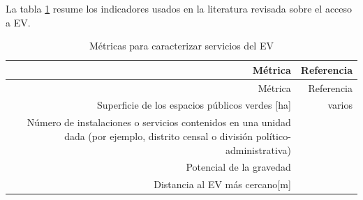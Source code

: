 \documentclass[12pt,]{book}
\begin{document}
La tabla \ref{tab:ind-EV} resume los indicadores usados en la literatura
revisada sobre el acceso a EV.

\begin{longtable}[]{@{}rr@{}}
\caption{\label{tab:ind-EV} Métricas para caracterizar servicios del
EV}\tabularnewline
\toprule
\begin{minipage}[b]{0.57\columnwidth}\raggedleft\strut
Métrica\strut
\end{minipage} & \begin{minipage}[b]{0.31\columnwidth}\raggedleft\strut
Referencia\strut
\end{minipage}\tabularnewline
\midrule
\endfirsthead
\toprule
\begin{minipage}[b]{0.57\columnwidth}\raggedleft\strut
Métrica\strut
\end{minipage} & \begin{minipage}[b]{0.31\columnwidth}\raggedleft\strut
Referencia\strut
\end{minipage}\tabularnewline
\midrule
\endhead
\begin{minipage}[t]{0.57\columnwidth}\raggedleft\strut
Superficie de los espacios públicos verdes {[}ha{]}\strut
\end{minipage} & \begin{minipage}[t]{0.31\columnwidth}\raggedleft\strut
varios\strut
\end{minipage}\tabularnewline
\begin{minipage}[t]{0.57\columnwidth}\raggedleft\strut
Número de instalaciones o servicios contenidos en una unidad dada (por
ejemplo, distrito censal o división político-administrativa)\strut
\end{minipage} & \begin{minipage}[t]{0.31\columnwidth}\raggedleft\strut
\citep{talen_assessing_1998}\strut
\end{minipage}\tabularnewline
\begin{minipage}[t]{0.57\columnwidth}\raggedleft\strut
Potencial de la gravedad\strut
\end{minipage} & \begin{minipage}[t]{0.31\columnwidth}\raggedleft\strut
\citep{talen_assessing_1998}\strut
\end{minipage}\tabularnewline
\begin{minipage}[t]{0.57\columnwidth}\raggedleft\strut
Distancia al EV más cercano{[}m{]}\strut
\end{minipage} & \begin{minipage}[t]{0.31\columnwidth}\raggedleft\strut

\end{minipage}
\end{longtable}
\end{document}
